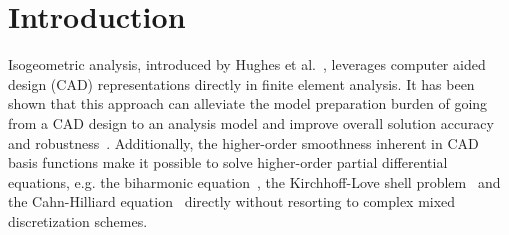 \chapter{Introduction}
\label{chp:chapter1}
\graphicspath{{figures/}{figures/chapter1/}}

Isogeometric analysis, introduced by Hughes et al.~\cite{HUGHES20054135}, leverages computer aided design (CAD) representations directly in finite element analysis. It has been shown that this approach can alleviate the model preparation burden of going from a CAD design to an analysis model and improve overall solution accuracy and robustness~\cite{bazilevs2006isogeometric, da2011some, da2014mathematical}. Additionally, the higher-order smoothness inherent in CAD basis functions make it possible to solve higher-order partial differential equations, e.g. the biharmonic equation~\cite{kapl_isogeometric_2015, kapl_isogeometric_2017}, the Kirchhoff-Love shell problem~\cite{kiendl2009isogeometric, kiendl2010bending, kiendl2015isogeometric} and the Cahn-Hilliard equation~\cite{gomez2008isogeometric, borden2014higher} directly without resorting to complex mixed discretization schemes.\par

